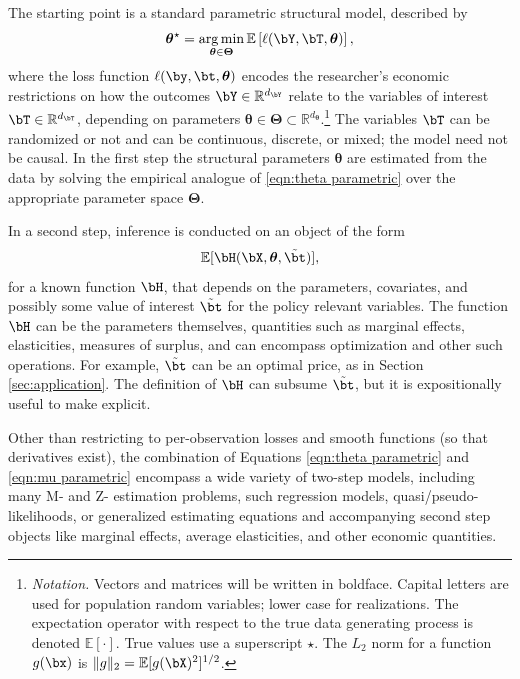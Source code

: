 \documentclass[12pt]{article}
\numberwithin{equation}{section}
\theoremstyle{definition}
\DeclareMathOperator*{\argmin}{arg\,min}
\newcommand{\E}{\mathbb{E}}
\newcommand{\R}{\mathbb{R}}
\newcommand{\btheta}{\boldsymbol{\theta}}
\newcommand{\bttrue}{\btheta^\star}
\newcommand{\btstar}{\tilde{\bt}}
\newcommand{\dy}{d_{\bY}}  %
\newcommand{\dt}{d_{\bT}}  %
\newcommand{\dtheta}{d_{\btheta}}  %
\begin{document}
The starting point is a standard parametric structural model, described by
\begin{equation}
    \label{eqn:theta parametric}
    \bttrue = \argmin_{\btheta \in \bm{\Theta}} \E \left[ \ell(\bY,\bT,\btheta) \right],
\end{equation}
where the loss function $\ell(\by, \bt, \btheta)$ encodes the researcher's economic restrictions on how the outcomes $\bY \in \R^{\dy}$ relate to the variables of interest $\bT \in \R^{\dt}$, depending on parameters $\btheta \in \bm{\Theta} \subset \R^{\dtheta}$.\footnote{
{\it Notation.} Vectors and matrices will be written in boldface. Capital letters are used for population random variables; lower case for realizations. The expectation operator with respect to the true data generating process is denoted $\E[\cdot]$. True values use a superscript $\star$. The $L_2$ norm for a function $g(\bx)$ is $\| g \|_2 = \E[g(\bX)^2]^{1/2}$.
}
The variables $\bT$ can be randomized or not and can be continuous, discrete, or mixed; the model need not be causal. In the first step the structural parameters $\btheta$ are estimated from the data by solving the empirical analogue of \eqref{eqn:theta parametric} over the appropriate parameter space $\bm{\Theta}$.


In a second step, inference is conducted on an object of the form
\begin{equation}
    \label{eqn:mu parametric}
    \E[\bH(\bX, \btheta, \btstar)],
\end{equation}
for a known function $\bH$, that depends on the parameters, covariates, and possibly some value of interest $\btstar$ for the policy relevant variables. The function $\bH$ can be the parameters themselves, quantities such as marginal effects, elasticities, measures of surplus, and can encompass optimization and other such operations. For example, $\btstar$ can be an optimal price, as in Section \ref{sec:application}. The definition of $\bH$ can subsume $\btstar$, but it is expositionally useful to make explicit. 


Other than restricting to per-observation losses and smooth functions (so that derivatives exist), the combination of Equations \eqref{eqn:theta parametric} and \eqref{eqn:mu parametric} encompass a wide variety of two-step models, including many M- and Z- estimation problems, such regression models, quasi/pseudo-likelihoods, or generalized estimating equations and accompanying second step objects like marginal effects, average elasticities, and other economic quantities.
\end{document}
